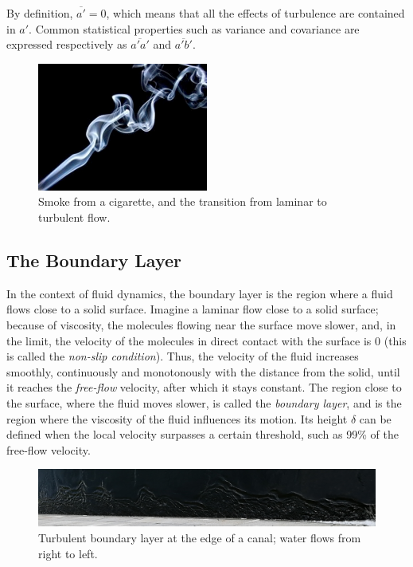 \documentclass[12pt]{book}
\begin{document}
By definition, $\overline{a'}=0$, which means that all the effects of turbulence are contained in $a'$. Common statistical properties such as variance and covariance are expressed respectively as $\overline{a'a'}$ and $\overline{a'b'}$.

\begin{figure}
\caption{Smoke from a cigarette, and the transition from laminar to turbulent flow.}
\label{fig:smoke}
\centering
\includegraphics[width=0.5\textwidth]{images/smoke}
\end{figure}


\subsection{The Boundary Layer}
In the context of fluid dynamics, the boundary layer is the region where a fluid flows close to a solid surface. Imagine a laminar flow close to a solid surface; because of viscosity, the molecules flowing near the surface move slower, and, in the limit, the velocity of the molecules in direct contact with the surface is 0 (this is called the \emph{non-slip condition}). Thus, the velocity of the fluid increases smoothly, continuously and monotonously with the distance from the solid, until it reaches the \emph{free-flow} velocity, after which it stays constant. The region close to the surface, where the fluid moves slower, is called the \emph{boundary layer}, and is the region where the viscosity of the fluid influences its motion. Its height $\delta$ can be defined when the local velocity surpasses a certain threshold, such as 99\% of the free-flow velocity.

\begin{figure}
\caption{Turbulent boundary layer at the edge of a canal; water flows from right to left.}
\label{fig:bl}
\centering
\includegraphics[width=\textwidth]{images/bl}
\end{figure}
\end{document}
